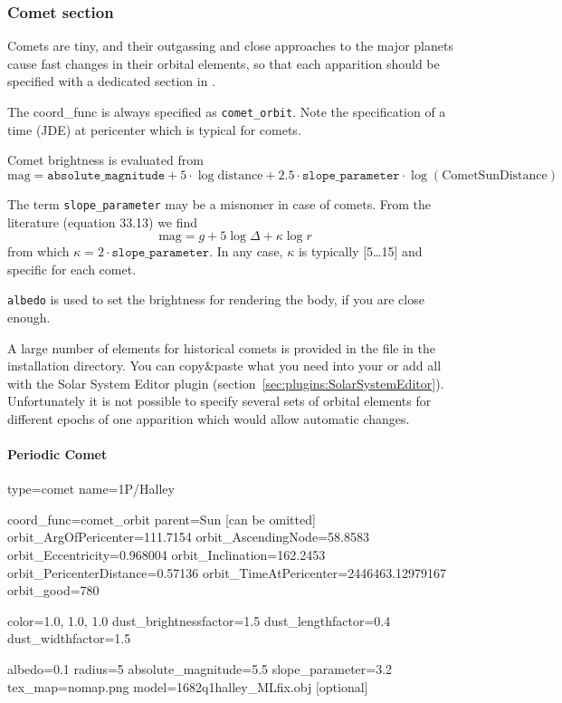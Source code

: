 \subsubsection{Comet section}
\label{sec:ssystem.ini:Comet}

Comets are tiny, and their outgassing and close approaches to the
major planets cause fast changes in their orbital elements, so that
each apparition should be specified with a dedicated section in
. 

The coord\_func is always specified as \texttt{comet\_orbit}.  Note the
specification of a time (JDE) at pericenter which is typical for
comets.

Comet brightness is evaluated from
\begin{equation}
  \label{eq:comet_magnitudes}
  \mathrm{mag}=\mathtt{absolute\_magnitude}+5\cdot\log{\mathrm{distance}} + 2.5\cdot\mathtt{slope\_parameter}\cdot\log(\mathrm{CometSunDistance})
\end{equation}

The term \texttt{slope\_parameter} may be a misnomer in case of
comets. From the literature \citep{AstronomicalAlgorithms:1998} (equation 33.13) we find
\begin{equation}
  \label{eq:comet_magnitudes_Meeus}
  \mathrm{mag}=g+5\log\Delta + \kappa\log r
\end{equation}
from which $\kappa=2\cdot\mathtt{slope\_parameter}$. In any case, $\kappa$ is typically [5\ldots15] and specific for each comet.

\texttt{albedo} is used to set the brightness for rendering the body,
if you are close enough. 

A large number of elements for historical comets is provided in the
file  in the installation directory. You
can copy\&paste what you need into your
 or add all with the Solar System Editor plugin (section~\ref{sec:plugins:SolarSystemEditor}). 
Unfortunately it is not possible to specify
several sets of orbital elements for different epochs of one apparition which would
allow automatic changes.

\paragraph{Periodic Comet}
\label{sec:ssystem.ini:Comet:Periodic}

\begin{configfile}
[1phalley]
type=comet  
name=1P/Halley

coord_func=comet_orbit
parent=Sun [can be omitted]
orbit_ArgOfPericenter=111.7154
orbit_AscendingNode=58.8583
orbit_Eccentricity=0.968004
orbit_Inclination=162.2453
orbit_PericenterDistance=0.57136
orbit_TimeAtPericenter=2446463.12979167
orbit_good=780

color=1.0, 1.0, 1.0
dust_brightnessfactor=1.5
dust_lengthfactor=0.4
dust_widthfactor=1.5

albedo=0.1
radius=5
absolute_magnitude=5.5
slope_parameter=3.2
tex_map=nomap.png
model=1682q1halley_MLfix.obj [optional]
\end{configfile}

